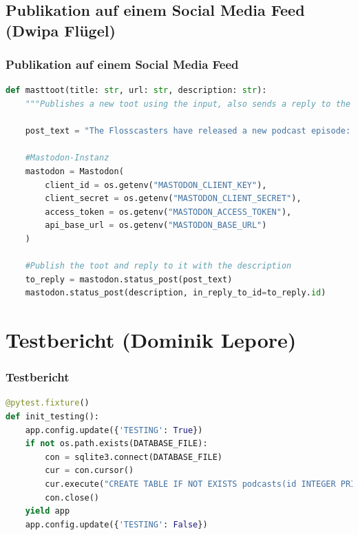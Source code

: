 \documentclass{beamer}
\begin{document}
\subsection{Publikation auf einem Social Media Feed \small{(Dwipa Flügel)}}
\begin{frame}[fragile]
\frametitle{Publikation auf einem Social Media Feed}
\begin{lstlisting}[language=Python, caption=Vollständige Funktion des \textit{Autotootings}]
def masttoot(title: str, url: str, description: str):
    """Publishes a new toot using the input, also sends a reply to the announcement with the description."""

    post_text = "The Flosscasters have released a new podcast episode: " + title + ". Check it out @ " + url

    #Mastodon-Instanz
    mastodon = Mastodon(
        client_id = os.getenv("MASTODON_CLIENT_KEY"),
        client_secret = os.getenv("MASTODON_CLIENT_SECRET"),
        access_token = os.getenv("MASTODON_ACCESS_TOKEN"),
        api_base_url = os.getenv("MASTODON_BASE_URL")
    )

    #Publish the toot and reply to it with the description
    to_reply = mastodon.status_post(post_text)
    mastodon.status_post(description, in_reply_to_id=to_reply.id)
\end{lstlisting}
\end{frame}

\section{Testbericht \small{(Dominik Lepore)}}
\begin{frame}[fragile]
\frametitle{Testbericht}
\begin{lstlisting}[language=Python, caption=Beispiel einer Fixture]
@pytest.fixture() 
def init_testing(): 
    app.config.update({'TESTING': True}) 
    if not os.path.exists(DATABASE_FILE): 
        con = sqlite3.connect(DATABASE_FILE) 
        cur = con.cursor() 
        cur.execute("CREATE TABLE IF NOT EXISTS podcasts(id INTEGER PRIMARY KEY, title, description, date, filepath)") 
        con.close() 
    yield app 
    app.config.update({'TESTING': False}) 
\end{lstlisting}
\end{frame}
\end{document}
